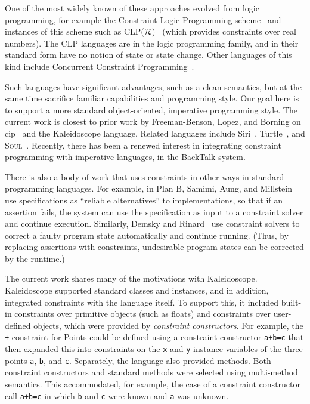 One of the most widely known of these approaches evolved from logic
programming, for example the Constraint Logic Programming
scheme~\cite{jaffar-popl-1987} and instances of this scheme such as
CLP($\cal R$)~\cite{jaffar-toplas-1992} (which provides constraints
over real numbers). The CLP languages are in the logic programming
family, and in their standard form have no notion of state or state
change.  Other languages of this kind include Concurrent Constraint
Programming~\cite{saraswat-book}.

Such languages have significant advantages, such as a clean semantics,
but at the same time sacrifice familiar capabilities and programming
style.  Our goal here is to support a more standard object-oriented,
imperative programming style.  The current work is closest to prior
work by Freeman-Benson, Lopez, and Borning on
\ac{cip}~\cite{freeman-benson-ecoop-1992,lopez-ecoop-1994,lopez-oopsla-1994,lopez-asi-1994}
and the Kaleidoscope language. Related languages include
Siri~\cite{horn-oopsla-1992}, Turtle~\cite{grabmuller2004turtle}, and
\textsc{Soul}~\cite{d2004seamless}.  Recently, there has been a
renewed interest in integrating constraint programming with imperative
languages, \eg in the BackTalk system\cite{roy1997reifying}.

There is also a body of work that uses constraints in other ways in
standard programming languages.  For example, in Plan B, Samimi, Aung, and
Millstein \cite{samimi-ecoop-2010} use specifications as ``reliable
alternatives'' to implementations, so that if an assertion fails, the
system can use the specification as input to a constraint solver and
continue execution.  Similarly, Demsky and Rinard~\cite{demsky2006goal}
use constraint solvers to correct a faulty program state automatically
and continue running.  (Thus, by replacing assertions with
constraints, undesirable program states can be corrected by the
runtime.)

The current work shares many of the motivations with Kaleidoscope.
Kaleidoscope supported standard classes and instances, and in
addition, integrated constraints with the language itself.  To support
this, it included built-in constraints over primitive objects (such as
floats) and constraints over user-defined objects, which were provided
by \emph{constraint constructors}.  For example, the \lstinline{+}
constraint for Points could be defined using a constraint constructor
\lstinline{a+b=c} that then expanded this into constraints on the
\lstinline{x} and \lstinline{y} instance variables of the three points
\lstinline{a}, \lstinline{b}, and \lstinline{c}.  Separately, the
language also provided methods.  Both constraint constructors and
standard methods were selected using multi-method semantics.  This
accommodated, for example, the case of a constraint constructor call
\lstinline{a+b=c} in which \lstinline{b} and \lstinline{c} were known
and \lstinline{a} was unknown.

